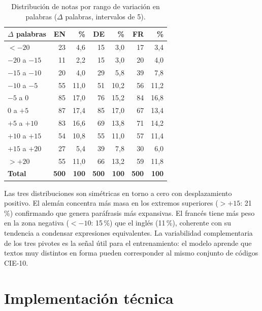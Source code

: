 \begin{table}[h]
\centering
\caption{Distribución de notas por rango de variación en palabras ($\Delta$ palabras, intervalos de 5).}
\label{tab:bt-dist}
\begin{tabular}{lrrrrrr}
\hline
\textbf{$\Delta$ palabras} & \textbf{EN} & \textbf{\%} & \textbf{DE} & \textbf{\%} & \textbf{FR} & \textbf{\%} \\
\hline
$< -20$        &  23 &  4,6 &  15 &  3,0 &  17 &  3,4 \\
$-20$ a $-15$  &  11 &  2,2 &  15 &  3,0 &  20 &  4,0 \\
$-15$ a $-10$  &  20 &  4,0 &  29 &  5,8 &  39 &  7,8 \\
$-10$ a $-5$   &  55 & 11,0 &  51 & 10,2 &  56 & 11,2 \\
$-5$ a $0$     &  85 & 17,0 &  76 & 15,2 &  84 & 16,8 \\
$0$ a $+5$     &  87 & 17,4 &  85 & 17,0 &  67 & 13,4 \\
$+5$ a $+10$   &  83 & 16,6 &  69 & 13,8 &  71 & 14,2 \\
$+10$ a $+15$  &  54 & 10,8 &  55 & 11,0 &  57 & 11,4 \\
$+15$ a $+20$  &  27 &  5,4 &  39 &  7,8 &  30 &  6,0 \\
$> +20$        &  55 & 11,0 &  66 & 13,2 &  59 & 11,8 \\
\hline
\textbf{Total} & \textbf{500} & \textbf{100} & \textbf{500} & \textbf{100} & \textbf{500} & \textbf{100} \\
\hline
\end{tabular}
\end{table}

Las tres distribuciones son simétricas en torno a cero con desplazamiento positivo. El alemán concentra más masa en los extremos superiores ($>+15$: 21\,\%) confirmando que genera paráfrasis más expansivas. El francés tiene más peso en la zona negativa ($< -10$: 15\,\%) que el inglés (11\,\%), coherente con su tendencia a condensar expresiones equivalentes. La variabilidad complementaria de los tres pivotes es la señal útil para el entrenamiento: el modelo aprende que textos muy distintos en forma pueden corresponder al mismo conjunto de códigos CIE-10.

\section{Implementación técnica}

